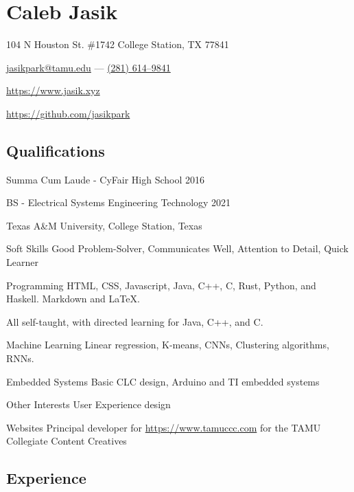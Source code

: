 \documentclass[letterpaper,10pt]{article}
\begin{document}
    \section{\Huge Caleb Jasik}\label{sec:hugecaleb-jasik}

    \hfill 104 N Houston St. \#1742 College Station, TX 77841

    \hfill \href{mailto:jasikpark@tamu.edu}{jasikpark@tamu.edu} ---
    \href{tel:2816149841}{(281) 614--9841}

    \hfill \href{https://jasik.xyz}{https://www.jasik.xyz}

    \hfill \href{https://github.com/jasikpark}{https://github.com/jasikpark}

    \subsection{Qualifications}\label{subsec:qualifications}

    Summa Cum Laude - CyFair High School 2016

    BS - Electrical Systems Engineering Technology 2021

    Texas A\&M University, College Station, Texas

    \begin{skills}
        \item[Soft Skills]
        Good Problem-Solver, Communicates Well, Attention to Detail, Quick Learner
        \item[Programming]
        HTML, CSS, Javascript, Java, C++, C, Rust, Python, and Haskell. Markdown and LaTeX.

        All self-taught, with directed learning for Java, C++, and C\@.
        \item[Machine Learning]
        Linear regression, K-means, CNNs, Clustering algorithms, RNNs.
        \item[Embedded Systems]
        Basic CLC design, Arduino and TI embedded systems
        \item[Other Interests]
        User Experience design
        \item[Websites]
        Principal developer for \href{https://www.tamuccc.com}{https://www.tamuccc.com} for the TAMU Collegiate Content Creatives
    \end{skills}


    \subsection{Experience}\label{subsec:experience}
\end{document}
